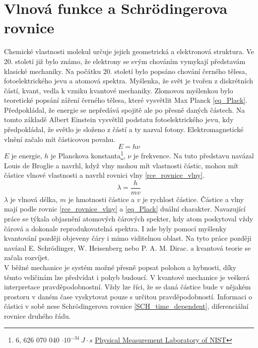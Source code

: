 \documentclass[
  digital, %
  table,   %
  lof,     %
  lot,     %
]{fithesis3}
\begin{document}
\section{Vlnová funkce a Schrödingerova rovnice}
Chemické vlastnosti molekul určuje jejich geometrická a elektronová struktura. Ve 20. století již bylo známo, že elektrony se svým chováním vymykají představám klasické mechaniky. Na počátku 20. století bylo popsáno chování černého tělesa, fotoelektrického jevu a atomová spektra. Myšlenka, že svět je tvořen z diskrétních částí, kvant, vedla k vzniku kvantové mechaniky. Zlomovou myšlenkou bylo teoretické popsání záření černého tělesa, které vysvětlit Max Planck \ref{eq_Plack}. Předpokládal, že energie se nepředává spojitě ale po přesně daných částech. Na tomto základě Albert Einstein vysvětlil podstatu fotoelektrického jevu, kdy předpokládal, že světlo je složeno z částí a ty nazval fotony. Elektromagnetické vlnění začalo mít částicovou povahu.
\begin{equation}
E = h \nu
\label{eq_Plack}
\end{equation}
$E$ je energie, $h$  je Planckova konstanta\footnote{6, 626 070 040  $\cdot 10^{-34} ~ J \cdot s$ \href{http://physics.nist.gov/cgi-bin/cuu/Value?h}{ Physical Measurement Laboratory of NIST}  }, $\nu$ je frekvence. Na tuto představu navázal Louis de Broglie a navrhl, když vlny mohou mít vlastnosti částic, mohou mít částice vlnové vlastnosti a navrhl rovnici vlny \ref{rce_rovnice_vlny}.
\begin{equation}
\lambda = \frac{h}{mv}
\label{rce_rovnice_vlny}
\end{equation}
$\lambda$ je vlnová délka, $m$ je hmotnosti částice a $v$ je rychlost částice. Částice a vlny mají podle rovnic \ref{rce_rovnice_vlny} a \ref{eq_Plack} duální charakter. Navazující práce se týkala objasnění atomových čárových spekter, kdy atom poskytoval vždy čárová a dokonale reprodukovatelná spektra. I zde byly pomocí myšlenky kvantování později objeveny čáry i mimo viditelnou oblast. Na tyto práce později navázal E. Schrödinger, W. Heisenberg nebo P. A. M. Dirac. a kvantová teorie se začala rozvíjet. \cite{celyprincipy}\\
V běžné mechanice je systém možné přesně popsat polohou a hybnosti, díky těmto veličinám lze předvídat i pohyb budoucí. V kvantové mechanice je veškerá interpretace pravděpodobnostní. Vždy lze říci, že se daná částice bude v nějakém prostoru v daném čase vyskytovat pouze s určitou pravděpodobností. Informaci o částici v sobě nese Schrödingerova rovnice \ref{SCH_time_dependent}, diferenciální rovnice druhého řádu.\cite{polak2000obecna}
\end{document}
